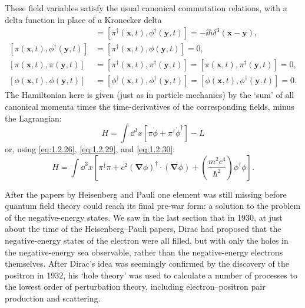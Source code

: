 These field variables satisfy the usual canonical commutation relations,
with a delta function in place of a Kronecker delta
\begin{align}
  [\pi(\mathbf x,t),\phi(\mathbf y,t)]
    &=[\pi^{\dagger}(\mathbf x,t),\phi^{\dagger}(\mathbf y,t)]
     =-\ii\hbar\delta^3(\mathbf x-\mathbf y),
  \tag{1.2.31}\label{eq:1.2.31}\\
  [\pi(\mathbf x,t),\phi^{\dagger}(\mathbf y,t)]
    &=[\pi^{\dagger}(\mathbf x,t),\phi(\mathbf y,t)]=0,
  \tag{1.2.32}\label{eq:1.2.32}\\
  [\pi(\mathbf x,t),\pi(\mathbf y,t)]
    &=[\pi^{\dagger}(\mathbf x,t),\pi^{\dagger}(\mathbf y,t)]
     =[\pi(\mathbf x,t),\pi^{\dagger}(\mathbf y,t)]=0,
  \tag{1.2.33}\label{eq:1.2.33}\\
  [\phi(\mathbf x,t),\phi(\mathbf y,t)]
    &=[\phi^{\dagger}(\mathbf x,t),\phi^{\dagger}(\mathbf y,t)]
     =[\phi(\mathbf x,t),\phi^{\dagger}(\mathbf y,t)]=0.
  \tag{1.2.34}\label{eq:1.2.34}
\end{align}
The Hamiltonian here is given (just as in particle mechanics) by the `sum' of
all canonical momenta times the time-derivatives of the corresponding fields,
minus the Lagrangian:
\begin{equation}
  H=\int \dd^3x\left[\pi\dot\phi+\pi^{\dagger}\dot\phi^{\dagger}\right]-L
  \tag{1.2.35}\label{eq:1.2.35}
\end{equation}
or, using \eqref{eq:1.2.26}, \eqref{eq:1.2.29}, and \eqref{eq:1.2.30}:
\begin{equation}
  H=\int \dd^3x\left[
    \pi^{\dagger}\pi
    +c^2(\boldsymbol\nabla\phi)^{\dagger}\cdot(\boldsymbol\nabla\phi)
    +\left(\frac{m^2c^4}{\hbar^2}\right)\phi^{\dagger}\phi
  \right].
  \tag{1.2.36}\label{eq:1.2.36}
\end{equation}

After the papers by Heisenberg and Pauli one element was still missing before
quantum field theory could reach its final pre-war form: a solution to the
problem of the negative-energy states. We saw in the last section that in
1930, at just about the time of the Heisenberg--Pauli papers, Dirac had
proposed that the negative-energy states of the electron were all filled, but
with only the holes in the negative-energy sea observable, rather than the
negative-energy electrons themselves. After Dirac's idea was seemingly
confirmed by the discovery of the positron in 1932, his `hole theory' was
used to calculate a number of processes to the lowest order of perturbation
theory, including electron--positron pair production and scattering.

